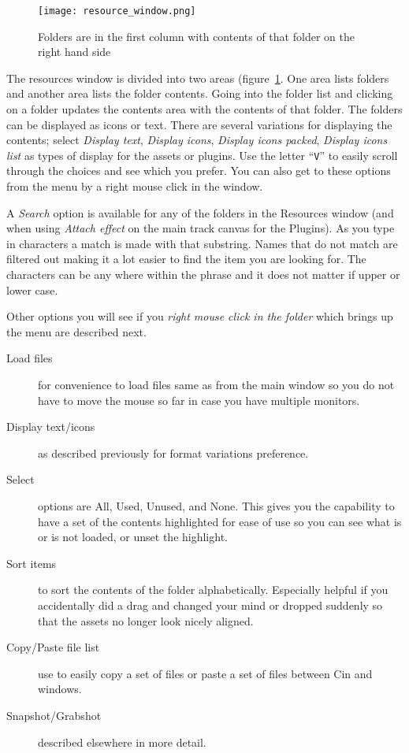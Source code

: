 \begin{figure}[htpb]
    \centering
    \texttt{[image: resource\_window.png]}
    \caption{Folders are in the first column with contents of that folder on the right hand side}
    \label{fig:resource_window}
\end{figure}

The resources window is divided into two areas (figure~\ref{fig:resource_window}. 
One area lists folders and another area lists the folder contents. 
Going into the folder list and clicking on a folder updates the contents area with the contents of that folder. 
The folders can be displayed as icons or text. 
There are several variations for displaying the contents; select \emph{Display text}, \emph{Display icons}, \emph{Display icons packed}, \emph{Display icons list} as types of display for the assets or plugins. 
Use the letter “\texttt{V}” to easily scroll through the choices and see which you prefer.  
You can also get to these options from the menu by a right mouse click in the window.

A \emph{Search} option is available for any of the folders in the Resources window (and when using \textit{Attach effect} on the main track canvas for the Plugins).  
As you type in characters a match is made with that substring.  
Names that do not match are filtered out making it a lot easier to find the item you are looking for.  
The characters can be any where within the phrase and it does not matter if upper or lower case. 

Other options you will see if you \textit{right mouse click in the folder} which brings up the menu are described next.  

\begin{description}
    \item[ Load files ]  for convenience to load files same as from the main window so you do not have to move the mouse so far in case you have multiple monitors.
    \item[Display text/icons]  as described previously for format variations preference.
    \item[Select]  options are All, Used, Unused, and None.  This gives you the capability to have a set of the
        contents highlighted for ease of use so you can see what is or is not loaded, or unset the highlight.
    \item[Sort items]  to sort the contents of the folder alphabetically.  Especially helpful if you accidentally did a 
        drag and changed your mind or dropped suddenly so that the assets no longer look nicely aligned.
    \item[Copy/Paste file list]  use to easily copy a set of files or paste a set of files between Cin and windows.
    \item[Snapshot/Grabshot]  described elsewhere in more detail.
\end{description}


